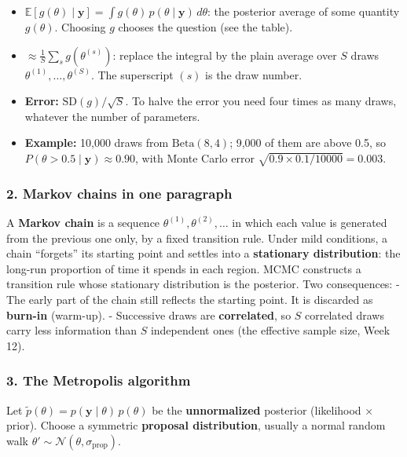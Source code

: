 \begin{itemize}
\tightlist
\item
  \(\mathbb{E}[g(\theta)\mid\mathbf{y}] = \int g(\theta)\,p(\theta\mid\mathbf{y})\,d\theta\):
  the posterior average of some quantity \(g(\theta)\). Choosing \(g\)
  chooses the question (see the table).
\item
  \(\approx \frac{1}{S}\sum_{s} g(\theta^{(s)})\): replace the integral
  by the plain average over \(S\) draws
  \(\theta^{(1)}, \dots, \theta^{(S)}\). The superscript \((s)\) is the
  draw number.
\item
  \textbf{Error:} \(\mathrm{SD}(g)/\sqrt{S}\). To halve the error you
  need four times as many draws, whatever the number of parameters.
\item
  \textbf{Example:} 10,000 draws from \(\mathrm{Beta}(8,4)\); 9,000 of
  them are above 0.5, so
  \(P(\theta > 0.5 \mid \mathbf{y}) \approx 0.90\), with Monte Carlo
  error \(\sqrt{0.9 \times 0.1/10000} = 0.003\).
\end{itemize}

\subsubsection{2. Markov chains in one paragraph}

A \textbf{Markov chain} is a sequence
\(\theta^{(1)}, \theta^{(2)}, \dots\) in which each value is generated
from the previous one only, by a fixed transition rule. Under mild
conditions, a chain ``forgets'' its starting point and settles into a
\textbf{stationary distribution}: the long-run proportion of time it
spends in each region. MCMC constructs a transition rule whose
stationary distribution is the posterior. Two consequences: - The early
part of the chain still reflects the starting point. It is discarded as
\textbf{burn-in} (warm-up). - Successive draws are \textbf{correlated},
so \(S\) correlated draws carry less information than \(S\) independent
ones (the effective sample size, Week 12).

\subsubsection{3. The Metropolis algorithm}

Let \(\tilde p(\theta) = p(\mathbf{y}\mid\theta)\,p(\theta)\) be the
\textbf{unnormalized} posterior (likelihood × prior). Choose a symmetric
\textbf{proposal distribution}, usually a normal random walk
\(\theta' \sim \mathcal{N}(\theta, \sigma_{\text{prop}})\).

